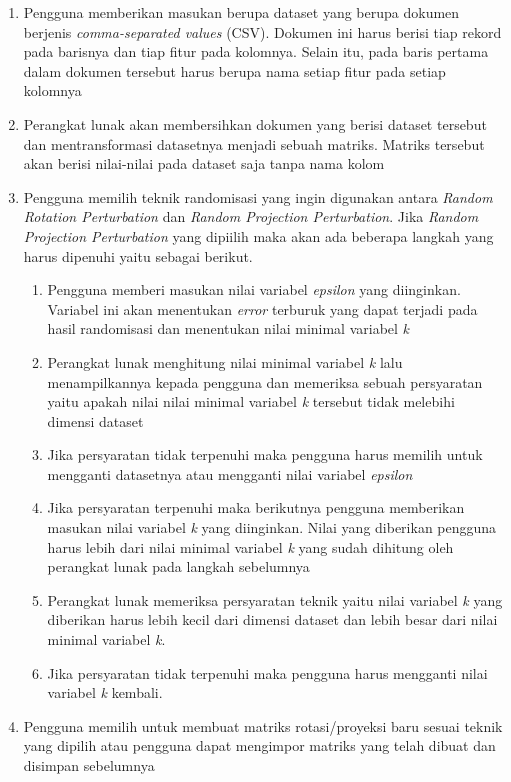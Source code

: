 \begin{enumerate}
    \item Pengguna memberikan masukan berupa dataset yang berupa dokumen berjenis \textit{comma-separated values} (CSV). Dokumen ini harus berisi tiap rekord pada barisnya dan tiap fitur pada kolomnya. Selain itu, pada baris pertama dalam dokumen tersebut harus berupa nama setiap fitur pada setiap kolomnya
    \item Perangkat lunak akan membersihkan dokumen yang berisi dataset tersebut dan mentransformasi datasetnya menjadi sebuah matriks. Matriks tersebut akan berisi nilai-nilai pada dataset saja tanpa nama kolom
    \item Pengguna memilih teknik randomisasi yang ingin digunakan antara \textit{Random Rotation Perturbation} dan \textit{Random Projection Perturbation}. Jika \textit{Random Projection Perturbation} yang dipiilih maka akan ada beberapa langkah yang harus dipenuhi yaitu sebagai berikut.
    \begin{enumerate}
        \item Pengguna memberi masukan nilai variabel \textit{epsilon} yang diinginkan. Variabel ini akan menentukan \textit{error} terburuk yang dapat terjadi pada hasil randomisasi dan menentukan nilai minimal variabel \textit{k}
        \item Perangkat lunak menghitung nilai minimal variabel \textit{k} lalu menampilkannya kepada pengguna dan memeriksa sebuah persyaratan yaitu apakah nilai nilai minimal variabel \textit{k} tersebut tidak melebihi dimensi dataset
        \item Jika persyaratan tidak terpenuhi maka pengguna harus memilih untuk mengganti datasetnya atau mengganti nilai variabel \textit{epsilon}
        \item Jika persyaratan terpenuhi maka berikutnya pengguna memberikan masukan nilai variabel \textit{k} yang diinginkan. Nilai yang diberikan pengguna harus lebih dari nilai minimal variabel \textit{k} yang sudah dihitung oleh perangkat lunak pada langkah sebelumnya
        \item Perangkat lunak memeriksa persyaratan teknik yaitu nilai variabel \textit{k} yang diberikan harus lebih kecil dari dimensi dataset dan lebih besar dari nilai minimal variabel \textit{k}.
        \item Jika persyaratan tidak terpenuhi maka pengguna harus mengganti nilai variabel \textit{k} kembali.
    \end{enumerate}
    \item Pengguna memilih untuk membuat matriks rotasi/proyeksi baru sesuai teknik yang dipilih atau pengguna dapat mengimpor matriks yang telah dibuat dan disimpan sebelumnya

\end{enumerate}
